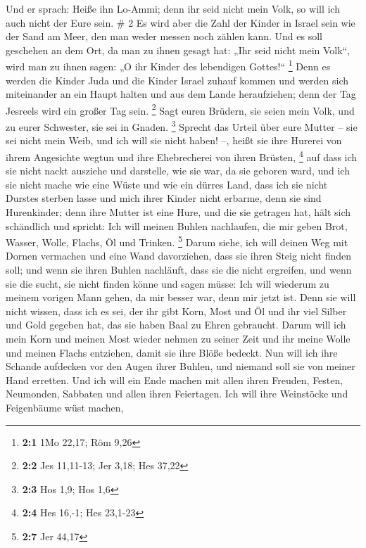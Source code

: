  Und er sprach: Heiße ihn Lo-Ammi; denn ihr seid nicht
mein Volk, so will ich auch nicht der Eure sein. \# 2  Es
wird aber die Zahl der Kinder in Israel sein wie der Sand am Meer, den
man weder messen noch zählen kann. Und es soll geschehen an dem Ort, da
man zu ihnen gesagt hat: „Ihr seid nicht mein Volk``, wird man zu ihnen
sagen: „O ihr Kinder des lebendigen Gottes!{}`` \footnote{\textbf{2:1}
  1Mo 22,17; Röm 9,26}  Denn es werden die Kinder Juda und
die Kinder Israel zuhauf kommen und werden sich miteinander an ein Haupt
halten und aus dem Lande heraufziehen; denn der Tag Jesreels wird ein
großer Tag sein. \footnote{\textbf{2:2} Jes 11,11-13; Jer 3,18; Hes
  37,22}  Sagt euren Brüdern, sie seien mein Volk, und zu
eurer Schwester, sie sei in Gnaden. \footnote{\textbf{2:3} Hos 1,9; Hos
  1,6}  Sprecht das Urteil über eure Mutter -- sie sei
nicht mein Weib, und ich will sie nicht haben! --, heißt sie ihre
Hurerei von ihrem Angesichte wegtun und ihre Ehebrecherei von ihren
Brüsten, \footnote{\textbf{2:4} Hes 16,-1; Hes 23,1-23} 
auf dass ich sie nicht nackt ausziehe und darstelle, wie sie war, da sie
geboren ward, und ich sie nicht mache wie eine Wüste und wie ein dürres
Land, dass ich sie nicht Durstes sterben lasse  und mich
ihrer Kinder nicht erbarme, denn sie sind Hurenkinder; 
denn ihre Mutter ist eine Hure, und die sie getragen hat, hält sich
schändlich und spricht: Ich will meinen Buhlen nachlaufen, die mir geben
Brot, Wasser, Wolle, Flachs, Öl und Trinken. \footnote{\textbf{2:7} Jer
  44,17}  Darum siehe, ich will deinen Weg mit Dornen
vermachen und eine Wand davorziehen, dass sie ihren Steig nicht finden
soll;  und wenn sie ihren Buhlen nachläuft, dass sie die
nicht ergreifen, und wenn sie die sucht, sie nicht finden könne und
sagen müsse: Ich will wiederum zu meinem vorigen Mann gehen, da mir
besser war, denn mir jetzt ist.  Denn sie will nicht
wissen, dass ich es sei, der ihr gibt Korn, Most und Öl und ihr viel
Silber und Gold gegeben hat, das sie haben Baal zu Ehren gebraucht.
 Darum will ich mein Korn und meinen Most wieder nehmen
zu seiner Zeit und ihr meine Wolle und meinen Flachs entziehen, damit
sie ihre Blöße bedeckt.  Nun will ich ihre Schande
aufdecken vor den Augen ihrer Buhlen, und niemand soll sie von meiner
Hand erretten.  Und ich will ein Ende machen mit allen
ihren Freuden, Festen, Neumonden, Sabbaten und allen ihren Feiertagen.
 Ich will ihre Weinstöcke und Feigenbäume wüst machen,
